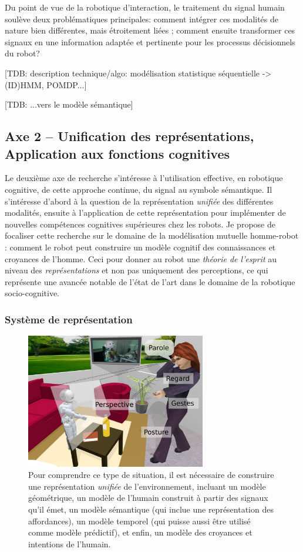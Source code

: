 \documentclass[a4paper]{article}
\begin{document}
Du point de vue de la robotique d'interaction, le traitement du signal humain
soulève deux problématiques principales: comment intégrer ces 
modalités de nature bien différentes, mais étroitement liées ; comment ensuite
transformer ces signaux en une information adaptée et pertinente pour les
processus décisionnels du robot?

[TDB: description technique/algo: modélisation statistique séquentielle ->
(ID)HMM, POMDP...]

[TDB: ...vers le modèle sémantique]

\subsection*{Axe 2 -- Unification des représentations, Application aux fonctions
cognitives}

Le deuxième axe de recherche s'intéresse à l'utilisation effective, en robotique
cognitive, de cette approche continue, du signal au symbole sémantique. Il
s'intéresse d'abord à la question de la représentation \emph{unifiée} des
différentes modalités, ensuite à l'application de cette représentation pour
implémenter de nouvelles compétences cognitives supérieures chez les robots. Je
propose de focaliser cette recherche sur le domaine de la modélisation mutuelle
homme-robot : comment le robot peut construire un modèle cognitif des
connaissances et croyances de l'homme. Ceci pour donner au robot une
\emph{théorie de l'esprit} au niveau des \emph{représentations} et non pas
uniquement des perceptions, ce qui représente une avancée notable de l'état de
l'art dans le domaine de la robotique socio-cognitive.

\subsubsection*{Système de représentation}

\begin{figure}
    \centering
\includegraphics[width=0.7\textwidth]{figs/signaux}
\caption{\small Pour comprendre ce type de situation, il est
    nécessaire de construire une représentation \emph{unifiée} de
    l'environnement, incluant un modèle géométrique, un modèle de l'humain
    construit à partir des signaux qu'il émet, un modèle
    sémantique (qui inclue une représentation des affordances), un modèle
    temporel (qui puisse aussi être utilisé comme modèle prédictif), et enfin,
    un modèle des croyances et intentions de l'humain.}
\label{babyplug}
\end{figure}
\end{document}

